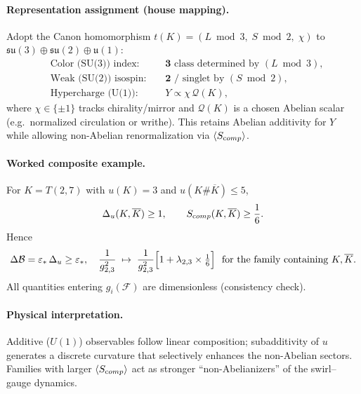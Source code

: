 \documentclass[11pt]{article}
\begin{document}
        \paragraph{Representation assignment (house mapping).}
            Adopt the Canon homomorphism \(t(K)=(L \bmod 3,\;S \bmod 2,\;\chi)\) to \(\mathfrak{su}(3)\oplus\mathfrak{su}(2)\oplus\mathfrak u(1)\):
            \[
                \begin{aligned}
                &\text{Color (SU(3)) index: } &&\mathbf 3 \text{ class determined by } (L \bmod 3),\\
                &\text{Weak (SU(2)) isospin: } &&\mathbf 2 \text{ / singlet by } (S \bmod 2),\\
                &\text{Hypercharge (U(1)): } &&Y\propto \chi\, \mathcal Q(K),
                \end{aligned}
            \]
            where \(\chi\in\{\pm1\}\) tracks chirality/mirror and \(\mathcal Q(K)\) is a chosen Abelian scalar (e.g.\ normalized circulation or writhe). This retains Abelian additivity for \(Y\) while allowing non-Abelian renormalization via \(\langle S_{\textrm comp}\rangle\).

        \paragraph{Worked composite example.}
            For \(K=T(2,7)\) with \(u(K)=3\) and \(u(K\#\overline K)\le 5\),
            \[
                \Delta_u(K,\overline K)\ge 1,\qquad
                S_{\textrm comp}(K,\overline K)\ge \frac{1}{6}.
            \]
            Hence
            \[
                \Delta\mathcal B=\varepsilon_*\,\Delta_u\ge \varepsilon_*,
                \quad
                \frac{1}{g_{2,3}^2}\;\mapsto\;\frac{1}{g_{2,3}^2}\Bigl[1+\lambda_{2,3}\times\tfrac{1}{6}\Bigr]
                \ \ \text{for the family containing }K,\overline K.
            \]
            All quantities entering \(g_i(\mathcal F)\) are dimensionless (consistency check).

        \paragraph{Physical interpretation.}
            Additive (\(U(1)\)) observables follow linear composition; subadditivity of \(u\) generates a discrete curvature that selectively enhances the non-Abelian sectors. Families with larger \(\langle S_{\textrm comp}\rangle\) act as stronger “non-Abelianizers” of the swirl–gauge dynamics.
\end{document}
